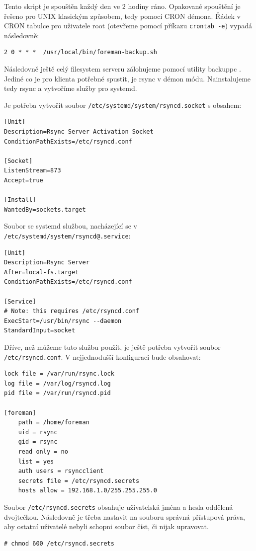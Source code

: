 \documentclass[thesis=B,czech]{FITthesis}[2012/06/26]
\begin{document}
Tento skript je spouštěn každý den ve 2 hodiny ráno. Opakované spouštění je řešeno pro UNIX klasickým způsobem, tedy pomocí CRON démona. Řádek v CRON tabulce pro uživatele root (otevřeme pomocí příkazu \texttt{crontab -e}) vypadá následovně: 

\begin{verbatim}
2 0 * * *  /usr/local/bin/foreman-backup.sh
\end{verbatim}



Následovně ještě celý filesystem serveru zálohujeme pomocí utility backuppc \cite{backuppc}. Jediné co je pro klienta potřebné spustit, je rsync v démon módu. Nainstalujeme tedy rsync a vytvoříme služby pro systemd. 

Je potřeba vytvořit soubor  \texttt{/etc/systemd/system/rsyncd.socket} s obsahem:
\begin{verbatim}
[Unit]
Description=Rsync Server Activation Socket
ConditionPathExists=/etc/rsyncd.conf

[Socket]
ListenStream=873
Accept=true

[Install]
WantedBy=sockets.target
\end{verbatim}

Soubor se systemd službou, nacházející se v \texttt{/etc/systemd/system/rsyncd@.service}:

\begin{verbatim}
[Unit]
Description=Rsync Server
After=local-fs.target
ConditionPathExists=/etc/rsyncd.conf

[Service]
# Note: this requires /etc/rsyncd.conf
ExecStart=/usr/bin/rsync --daemon
StandardInput=socket
\end{verbatim}



Dříve, než můžeme tuto službu použít, je ještě potřeba vytvořit soubor \texttt{/etc/rsyncd.conf}. V nejjednodušší konfiguraci bude obsahovat:

\begin{verbatim}
lock file = /var/run/rsync.lock
log file = /var/log/rsyncd.log
pid file = /var/run/rsyncd.pid

[foreman]
    path = /home/foreman
    uid = rsync
    gid = rsync
    read only = no
    list = yes
    auth users = rsyncclient
    secrets file = /etc/rsyncd.secrets
    hosts allow = 192.168.1.0/255.255.255.0
\end{verbatim}


Soubor \texttt{/etc/rsyncd.secrets} obsahuje uživatelská jména a hesla oddělená dvojtečkou. Následovně je třeba nastavit na souboru správná přístupová práva, aby ostatní uživatelé nebyli schopni soubor číst, či nijak upravovat.
\begin{verbatim}
# chmod 600 /etc/rsyncd.secrets
\end{verbatim}
\end{document}
